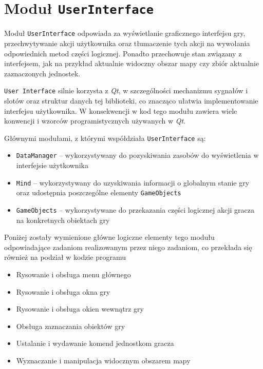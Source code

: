 \documentclass[licencjacka]{pracamgr}
\begin{document}
  \section{Moduł \texttt{UserInterface}}
    Moduł \texttt{UserInterface} odpowiada za wyświetlanie graficznego interfejsu gry, przechwytywanie akcji użytkownika
    oraz tłumaczenie tych akcji na wywołania odpowiednich metod części logicznej. Ponadto przechowuje stan związany
    z interfejsem, jak na przykład aktualnie widoczny obszar mapy czy zbiór aktualnie zaznaczonych jednostek.

    \texttt{User Interface} silnie korzysta z \emph{Qt}, w szczególności mechanizmu sygnałów i slotów oraz struktur danych
    tej biblioteki, co znacząco ułatwia implementowanie interfejsu użytkownika. W konsekwencji w kod tego modułu zawiera wiele
    konwencji i wzorców programistycznych używanych w \emph{Qt}.

    Głównymi modułami, z którymi współdziała \texttt{UserInterface} są:
    \begin{itemize}
     \item \texttt{DataManager} -- wykorzystywany do pozyskiwania zasobów do wyświetlenia w interfejsie użytkownika
     \item \texttt{Mind} -- wykorzystywany do uzyskiwania informacji o globalnym stanie gry oraz udostępnia poszczególne elementy \texttt{GameObjects}
     \item \texttt{GameObjects} -- wykorzystywane do przekazania części logicznej akcji gracza na konkretnych obiektach gry
    \end{itemize}

    Poniżej zostały wymienione główne logiczne elementy tego modułu odpowiadające zadaniom realizowanym przez niego zadaniom,
    co przekłada się również na podział w kodzie programu

    \begin{itemize}
     \item Rysowanie i obsługa menu głównego
     \item Rysowanie i obsługa okna gry
     \item Rysowanie i obsługa okien wewnątrz gry
     \item Obsługa zaznaczania obiektów gry
     \item Ustalanie i wydawanie komend jednostkom gracza
     \item Wyznaczanie i manipulacja widocznym obszarem mapy
    \end{itemize}
\end{document}
